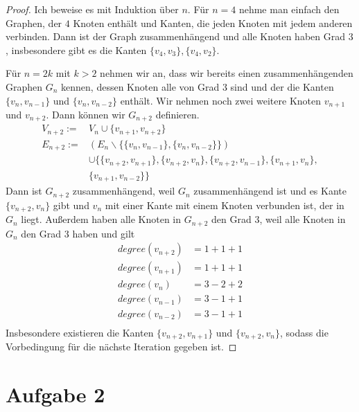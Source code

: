 \documentclass[a4paper,10pt]{article}
\begin{document}
\begin{proof}
 Ich beweise es mit Induktion über $n$.
 Für $n = 4$ nehme man einfach den Graphen, der $4$ Knoten enthält und Kanten, die jeden Knoten mit jedem anderen verbinden.
 Dann ist der Graph zusammenhängend und alle Knoten haben Grad $3$, insbesondere gibt es die Kanten $\{v_4, v_3\}, \{v_4, v_2\}$.
 
 Für $n = 2k$ mit $k > 2$ nehmen wir an, dass wir bereits einen zusammenhängenden Graphen $G_n$ kennen, dessen Knoten alle von Grad $3$ sind und der die Kanten $\{v_n, v_{n - 1}\}$ und $\{v_n, v_{n - 2}\}$ enthält.
 Wir nehmen noch zwei weitere Knoten $v_{n + 1}$ und $v_{n + 2}$.
 Dann können wir $G_{n + 2}$ definieren.
 \begin{align*}
  V_{n + 2} := & V_n \cup \{ v_{n + 1}, v_{n + 2} \}\\
  E_{n + 2} := & (E_n \backslash \{ \{v_n, v_{n - 1}\}, \{v_n, v_{n - 2}\} \})\\
  & \cup \{ \{v_{n + 2}, v_{n + 1}\}, \{v_{n + 2}, v_n\}, \{v_{n + 2}, v_{n - 1}\}, \{v_{n + 1}, v_n\},\\
  & \{v_{n + 1}, v_{n - 2}\} \}
 \end{align*}
 Dann ist $G_{n + 2}$ zusammenhängend, weil $G_n$ zusammenhängend ist und es Kante $\{v_{n + 2}, v_n\}$ gibt und $v_n$ mit einer Kante mit einem Knoten verbunden ist, der in $G_n$ liegt.
 Außerdem haben alle Knoten in $G_{n + 2}$ den Grad $3$, weil alle Knoten in $G_n$ den Grad $3$ haben und gilt
 \begin{align*}
  degree(v_{n + 2}) & = 1 + 1 + 1\\
  degree(v_{n + 1}) & = 1 + 1 + 1\\
  degree(v_n) & = 3 - 2 + 2\\
  degree(v_{n - 1}) & = 3 - 1 + 1\\
  degree(v_{n - 2}) & = 3 - 1 + 1\\
 \end{align*}
 Insbesondere existieren die Kanten $\{v_{n + 2}, v_{n + 1}\}$ und $\{v_{n + 2}, v_n\}$, sodass die Vorbedingung für die nächste Iteration gegeben ist.
\end{proof}

\section*{Aufgabe 2}
\end{document}
